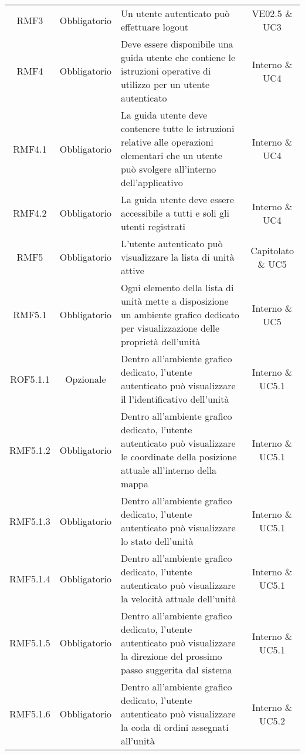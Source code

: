 \begin{longtable}[h!] { c c m{8cm} c}
		RMF3 & Obbligatorio & Un utente autenticato può effettuare logout & VE02.5 \& UC3 \\
		
		RMF4 & Obbligatorio & Deve essere disponibile una guida utente che contiene le istruzioni operative di utilizzo per un utente autenticato & Interno \& UC4 \\
		
		RMF4.1 & Obbligatorio & La guida utente deve contenere tutte le istruzioni relative alle operazioni elementari che un utente può svolgere all'interno dell'applicativo & Interno \& UC4 \\
		
		RMF4.2 & Obbligatorio & La guida utente deve essere accessibile a tutti e soli gli utenti registrati & Interno \& UC4 \\
		
		RMF5 & Obbligatorio & L'utente autenticato può visualizzare la lista di unità attive & Capitolato \& UC5 \\
			
		RMF5.1 & Obbligatorio & Ogni elemento della lista di unità mette a disposizione un ambiente grafico dedicato per visualizzazione delle proprietà dell'unità & Interno \& UC5 \\
		
		ROF5.1.1 & Opzionale & Dentro all'ambiente grafico dedicato, l'utente autenticato può visualizzare il l'identificativo dell'unità & Interno \& UC5.1 \\
		
		RMF5.1.2 & Obbligatorio & Dentro all'ambiente grafico dedicato, l'utente autenticato può visualizzare le coordinate della posizione attuale all'interno della mappa & Interno \& UC5.1 \\
		
		RMF5.1.3 & Obbligatorio &  Dentro all'ambiente grafico dedicato, l'utente autenticato può visualizzare lo stato dell'unità & Interno \& UC5.1 \\
		
		RMF5.1.4 & Obbligatorio &  Dentro all'ambiente grafico dedicato, l'utente autenticato può visualizzare la velocità attuale dell'unità & Interno \& UC5.1 \\
		
		RMF5.1.5 & Obbligatorio &  Dentro all'ambiente grafico dedicato, l'utente autenticato può visualizzare la direzione del prossimo passo suggerita dal sistema & Interno \& UC5.1 \\
		
		RMF5.1.6 & Obbligatorio &  Dentro all'ambiente grafico dedicato, l'utente autenticato può visualizzare la coda di ordini assegnati all'unità & Interno \& UC5.2 \\
		

\end{longtable}
